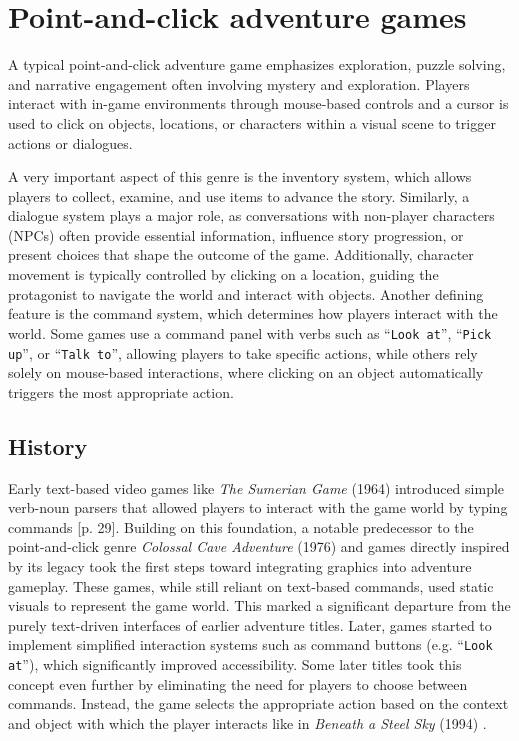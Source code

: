 \section{Point-and-click adventure games}
A typical point-and-click adventure game emphasizes exploration, puzzle solving, and narrative engagement often involving mystery and exploration. Players interact with in-game environments through mouse-based controls and a cursor is used to click on objects, locations, or characters within a visual scene to trigger actions or dialogues. 

A very important aspect of this genre is the inventory system, which allows players to collect, examine, and use items to advance the story. Similarly, a dialogue system plays a major role, as conversations with non-player characters (NPCs) often provide essential information, influence story progression, or present choices that shape the outcome of the game. Additionally, character movement is typically controlled by clicking on a location, guiding the protagonist to navigate the world and interact with objects. Another defining feature is the command system, which determines how players interact with the world. Some games use a command panel with verbs such as “\texttt{Look at}”, “\texttt{Pick up}”, or “\texttt{Talk to}”, allowing players to take specific actions, while others rely solely on mouse-based interactions, where clicking on an object automatically triggers the most appropriate action. 

\subsection{History}
Early text-based video games like \textit{The Sumerian Game} (1964) introduced simple verb-noun parsers that allowed players to interact with the game world by typing commands \cite{Salter2014}[p. 29]. Building on this foundation, a notable predecessor to the point-and-click genre \textit{Colossal Cave Adventure} (1976) and games directly inspired by its legacy took the first steps toward integrating graphics into adventure gameplay. These games, while still reliant on text-based commands, used static visuals to represent the game world. This marked a significant departure from the purely text-driven interfaces of earlier adventure titles. Later, games started to implement simplified interaction systems such as command buttons (e.g. “\texttt{Look at}”), which significantly improved accessibility. Some later titles took this concept even further by eliminating the need for players to choose between commands. Instead, the game selects the appropriate action based on the context and object with which the player interacts like in \textit{Beneath a Steel Sky} (1994) \cite{Carton2023history}.

